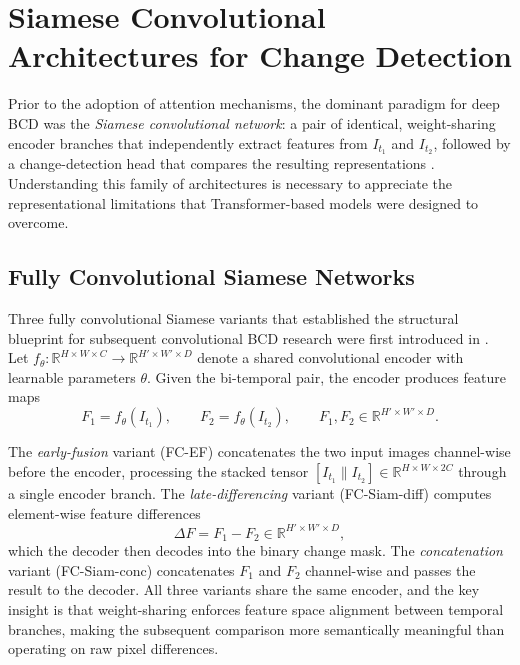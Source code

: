 \section{Siamese Convolutional Architectures for Change Detection}
\label{sec:siamese-conv}

Prior to the adoption of attention mechanisms, the dominant paradigm for deep \ac{BCD} was the \emph{Siamese convolutional network}: a pair of identical, weight-sharing encoder branches that independently extract features from $I_{t_1}$ and $I_{t_2}$, followed by a change-detection head that compares the resulting representations \cite{Daudt2018SiamICIP, Yang2021DeepSiamese}. Understanding this family of architectures is necessary to appreciate the representational limitations that Transformer-based models were designed to overcome.

\subsection{Fully Convolutional Siamese Networks}

Three fully convolutional Siamese variants that established the structural blueprint for subsequent convolutional \ac{BCD} research were first introduced in \cite{Daudt2018SiamICIP}. Let $f_\theta: \mathbb{R}^{H \times W \times C} \to \mathbb{R}^{H' \times W' \times D}$ denote a shared convolutional encoder with learnable parameters $\theta$. Given the bi-temporal pair, the encoder produces feature maps
\begin{equation}
F_1 = f_\theta(I_{t_1}), \qquad F_2 = f_\theta(I_{t_2}),
\qquad F_1, F_2 \in \mathbb{R}^{H' \times W' \times D}.
\label{eq:siamese_features}
\end{equation}

The \emph{early-fusion} variant (FC-EF) concatenates the two input images channel-wise before the encoder, processing the stacked tensor $[I_{t_1} \| I_{t_2}] \in \mathbb{R}^{H \times W \times 2C}$ through a single encoder branch. The \emph{late-differencing} variant (FC-Siam-diff) computes element-wise feature differences
\begin{equation}
\Delta F = F_1- F_2 \in \mathbb{R}^{H' \times W' \times D},
\label{eq:feature_diff}
\end{equation}
which the decoder then decodes into the binary change mask. The \emph{concatenation} variant (FC-Siam-conc) concatenates $F_1$ and $F_2$ channel-wise and passes the result to the decoder. All three variants share the same encoder, and the key insight is that weight-sharing enforces feature space alignment between temporal branches, making the subsequent comparison more semantically meaningful than operating on raw pixel differences.


